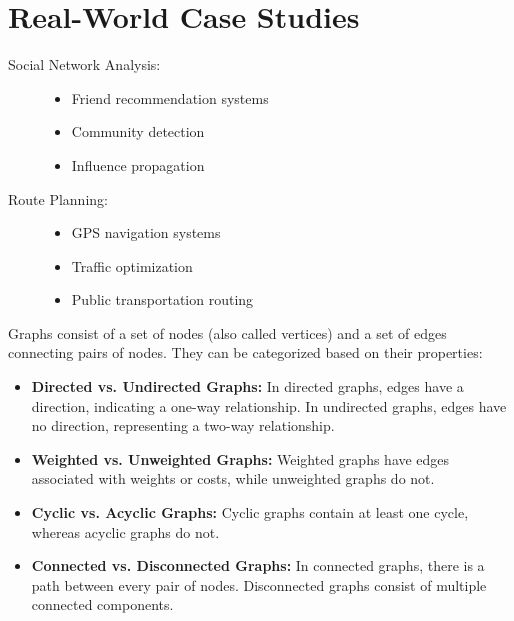 \section*{Real-World Case Studies}
\begin{description}
    \item[Social Network Analysis:] 
        \begin{itemize}
            \item Friend recommendation systems
            \item Community detection
            \item Influence propagation
        \end{itemize}
    
    \item[Route Planning:] 
        \begin{itemize}
            \item GPS navigation systems
            \item Traffic optimization
            \item Public transportation routing
        \end{itemize}
\end{description}

Graphs consist of a set of nodes (also called vertices) and a set of edges connecting pairs of nodes. They can be categorized based on their properties:

\begin{itemize}
    \item \textbf{Directed vs. Undirected Graphs:} In directed graphs, edges have a direction, indicating a one-way relationship. In undirected graphs, edges have no direction, representing a two-way relationship.
    
    \item \textbf{Weighted vs. Unweighted Graphs:} Weighted graphs have edges associated with weights or costs, while unweighted graphs do not.
    
    \item \textbf{Cyclic vs. Acyclic Graphs:} Cyclic graphs contain at least one cycle, whereas acyclic graphs do not.
    
    \item \textbf{Connected vs. Disconnected Graphs:} In connected graphs, there is a path between every pair of nodes. Disconnected graphs consist of multiple connected components.
\end{itemize}

